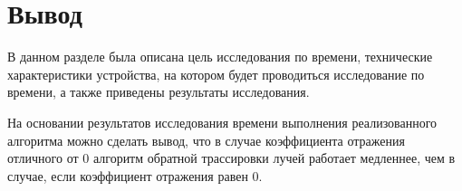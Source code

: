 \section*{Вывод}

В данном разделе была описана цель исследования по времени, технические характеристики устройства, на котором будет проводиться исследование по времени, а также приведены результаты исследования.

На основании результатов исследования времени выполнения реализованного алгоритма можно сделать вывод, что в случае коэффициента отражения отличного от 0 алгоритм обратной трассировки лучей работает медленнее, чем в случае, если коэффициент отражения равен 0.


